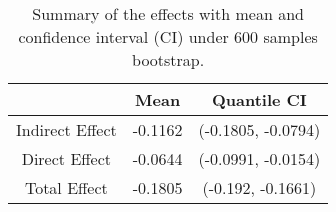 \begin{table}[H]
\centering
\small 
\begin{tabular}{ccc}
\hline
\multicolumn{1}{c|}{}                & \multicolumn{1}{c|}{Mean} &Quantile CI\\ \hline
\multicolumn{1}{c|}{Indirect Effect} & \multicolumn{1}{c|}{-0.1162}     &(-0.1805, -0.0794)\\ \hline
\multicolumn{1}{c|}{Direct Effect} & \multicolumn{1}{c|}{-0.0644}     &(-0.0991, -0.0154)\\ \hline
\multicolumn{1}{c|}{Total Effect} & \multicolumn{1}{c|}{-0.1805}     &(-0.192, -0.1661)\\ \hline
\end{tabular}
\caption{Summary of the effects with mean and confidence interval (CI) under 600 samples bootstrap.} 
\label{tab:results1}
\end{table}
